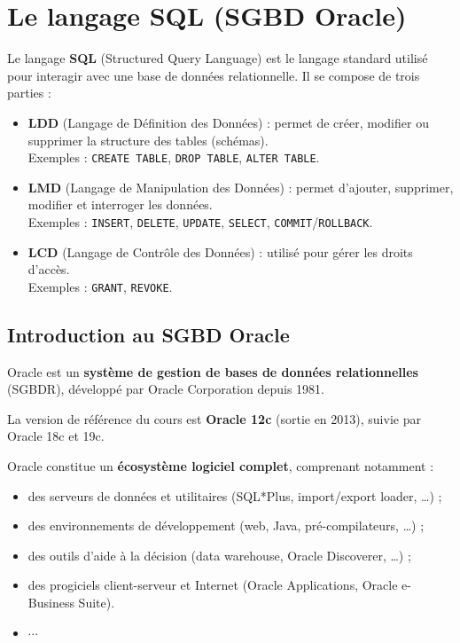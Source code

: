 \chapter{Le langage SQL (SGBD Oracle)}

Le langage \textbf{SQL} (Structured Query Language) est le langage standard utilisé pour interagir avec une base de données relationnelle. Il se compose de trois parties :

\begin{itemize}
    \item \textbf{LDD} (Langage de Définition des Données) : permet de créer, modifier ou supprimer la structure des tables (schémas).\\
    Exemples : \texttt{CREATE TABLE}, \texttt{DROP TABLE}, \texttt{ALTER TABLE}.
    \item \textbf{LMD} (Langage de Manipulation des Données) : permet d’ajouter, supprimer, modifier et interroger les données.\\
    Exemples : \texttt{INSERT}, \texttt{DELETE}, \texttt{UPDATE}, \texttt{SELECT}, \texttt{COMMIT}/\texttt{ROLLBACK}.
    \item \textbf{LCD} (Langage de Contrôle des Données) : utilisé pour gérer les droits d’accès.\\
    Exemples : \texttt{GRANT}, \texttt{REVOKE}.
\end{itemize}

\section{Introduction au SGBD Oracle}

Oracle est un \textbf{système de gestion de bases de données relationnelles} (SGBDR), développé par Oracle Corporation depuis 1981.

La version de référence du cours est \textbf{Oracle 12c} (sortie en 2013), suivie par Oracle 18c et 19c.

Oracle constitue un \textbf{écosystème logiciel complet}, comprenant notamment :

\begin{itemize}
    \item des serveurs de données et utilitaires (SQL*Plus, import/export loader, \dots) ;
    \item des environnements de développement (web, Java, pré-compilateurs, \dots) ;
    \item des outils d’aide à la décision (data warehouse, Oracle Discoverer, \dots) ;
    \item des progiciels client-serveur et Internet (Oracle Applications, Oracle e-Business Suite).
    \item $\cdots$
\end{itemize}

